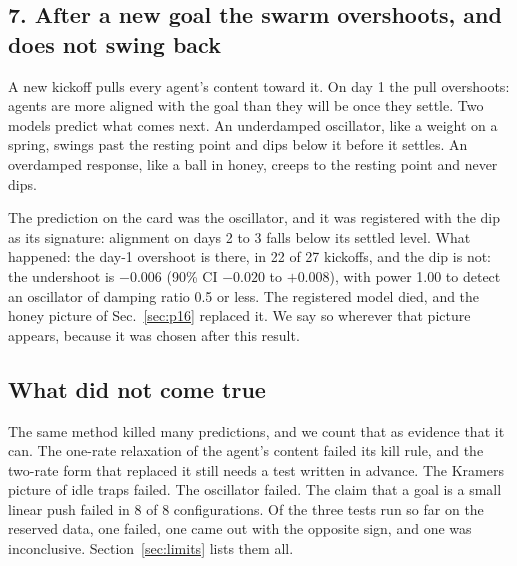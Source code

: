 \subsection*{7. After a new goal the swarm overshoots, and does not swing back}

A new kickoff pulls every agent's content toward it. On day 1 the pull overshoots: agents are more aligned with the goal than they will be once they settle. Two models predict what comes next. An underdamped oscillator, like a weight on a spring, swings past the resting point and dips below it before it settles. An overdamped response, like a ball in honey, creeps to the resting point and never dips.

The prediction on the card was the oscillator, and it was registered with the dip as its signature: alignment on days 2 to 3 falls below its settled level. What happened: the day-1 overshoot is there, in 22 of 27 kickoffs, and the dip is not: the undershoot is $-0.006$ (90\% CI $-0.020$ to $+0.008$), with power 1.00 to detect an oscillator of damping ratio 0.5 or less. The registered model died, and the honey picture of Sec.~\ref{sec:p16} replaced it. We say so wherever that picture appears, because it was chosen after this result.

\subsection*{What did not come true}

The same method killed many predictions, and we count that as evidence that it can. The one-rate relaxation of the agent's content failed its kill rule, and the two-rate form that replaced it still needs a test written in advance. The Kramers picture of idle traps failed. The oscillator failed. The claim that a goal is a small linear push failed in 8 of 8 configurations. Of the three tests run so far on the reserved data, one failed, one came out with the opposite sign, and one was inconclusive. Section~\ref{sec:limits} lists them all.

